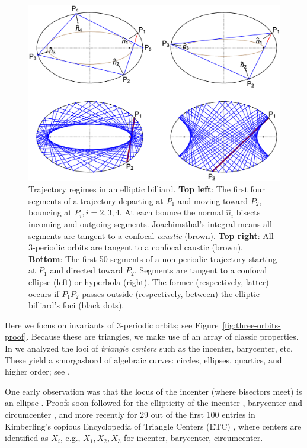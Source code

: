 \documentclass{amsart}
\theoremstyle{definition}
\begin{document}
\begin{figure}[H]
    \centering
    \includegraphics[width=.8\textwidth]{1010_billiard_trajectories.eps}
    \caption{Trajectory regimes in an elliptic billiard. \textbf{Top left}: The first four segments of a trajectory departing at $P_1$ and moving toward $P_2$, bouncing at $P_i, i=2,3,4$. At each bounce the normal $\hat{n}_i$ bisects incoming and outgoing segments. Joachimsthal's integral \cite{sergei91} means all segments are tangent to a confocal {\em caustic} (brown). \textbf{Top right}: All 3-periodic orbits are tangent to a confocal caustic (brown). \textbf{Bottom}: The first 50 segments of a non-periodic trajectory starting at $P_1$ and directed toward $P_2$. Segments are tangent to a confocal ellipse (left) or hyperbola (right). The former (respectively, latter) occurs if $P_1P_2$ passes outside (respectively, between) the elliptic billiard's foci (black dots).}
    \label{fig:billiard-trajectories}
\end{figure}

Here we focus on invariants of 3-periodic orbits; see Figure~\ref{fig:three-orbits-proof}. Because these  are triangles, we make use of an array of classic properties. In \cite{reznik2019-intelligencer,reznik2020-loci} we analyzed the loci of {\em triangle centers} \cite{kimberling97-major-centers} such as the incenter, barycenter, etc. These yield a smorgasbord of algebraic curves: circles, ellipses, quartics, and higher order; see \cite{reznik2019-locus-gallery}.

One early observation was that the locus of the incenter (where bisectors meet) is an ellipse \cite[PL\#01]{reznik2020-playlist-proofs}. Proofs soon followed for the ellipticity of the incenter \cite{olga14}, barycenter \cite{sergei07_grid} and circumcenter \cite{corentin19,garcia2019-ellipses}, and more recently \cite{reznik2020-loci} for 29 out of the first 100 entries in Kimberling's copious Encyclopedia of Triangle Centers (ETC) \cite{etc}, where centers are identified as $X_i$, e.g., $X_1,X_2,X_3$ for incenter, barycenter, circumcenter.
\end{document}
